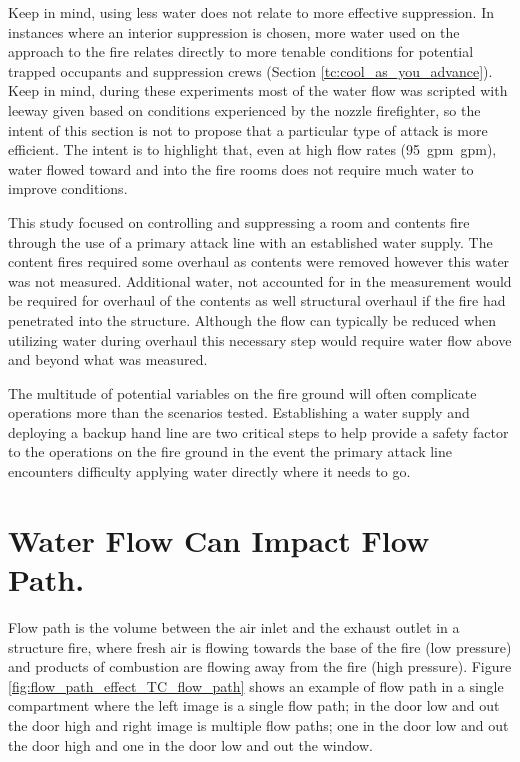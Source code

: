 \documentclass[12pt,oneside]{book}
\begin{document}
Keep in mind, using less water does not relate to more effective suppression. In instances where an interior suppression is chosen, more water used on the approach to the fire relates directly to more tenable conditions for potential trapped occupants and suppression crews (Section \ref{tc:cool_as_you_advance}). Keep in mind, during these experiments most of the water flow was scripted with leeway given based on conditions experienced by the nozzle firefighter, so the intent of this section is not to propose that a particular type of attack is more efficient. The intent is to highlight that, even at high flow rates (95~gpm~gpm), water flowed toward and into the fire rooms does not require much water to improve conditions.

This study focused on controlling and suppressing a room and contents fire through the use of a primary attack line with an established water supply. The content fires required some overhaul as contents were removed however this water was not measured. Additional water, not accounted for in the measurement would be required for overhaul of the contents as well structural overhaul if the fire had penetrated into the structure. Although the flow can typically be reduced when utilizing water during overhaul this necessary step would require water flow above and beyond what was measured.

The multitude of potential variables on the fire ground will often complicate operations more than the scenarios tested. Establishing a water supply and deploying a backup hand line are two critical steps to help provide a safety factor to the operations on the fire ground in the event the primary attack line encounters difficulty applying water directly where it needs to go.  

\section{Water Flow Can Impact Flow Path.} \label{tc:water_impact_flowpath}
Flow path is the volume between the air inlet and the exhaust outlet in a structure fire, where fresh air is flowing towards the base of the fire (low pressure) and products of combustion are flowing away from the fire (high pressure). Figure \ref{fig:flow_path_effect_TC_flow_path} shows an example of flow path in a single compartment where the left image is a single flow path; in the door low and out the door high and right image is multiple flow paths; one in the door low and out the door high and one in the door low and out the window. 
\end{document}
